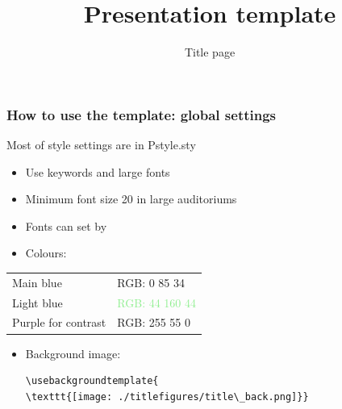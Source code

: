 \documentclass[aspectratio=169, 18pt]{beamer}
\title{Presentation template}
\subtitle{Title page}
\begin{document}
	
	
	\FirstFrame	
	\begin{frame}
	\titlepage
	\end{frame}
	
	\FrameStyleOne
	\begin{frame}[fragile]
		\frametitle{How to use the template: global settings}
		
		Most of style settings are in Pstyle.sty
		\begin{itemize}
			\item Use keywords and large fonts
			\item Minimum font size 20 in large auditoriums
			\item Fonts can set by \texttt{\setmainfont{fontname}}
			\item Colours:
		\end{itemize}
			\centering
			\begin{tabular}{ll}
				Main blue & \textcolor{maingreen}{RGB: 0 85 34} \\
				Light blue & \textcolor{lightgreen}{RGB: 44 160 44} \\
				Purple for contrast & \textcolor{orangec}{RGB: 255 55 0} \\
			\end{tabular}
			
		\begin{itemize}
			\item Background image: 
			\begin{verbatim}
\usebackgroundtemplate{
\texttt{[image: ./titlefigures/title\_back.png]}}
			\end{verbatim}
		\end{itemize}
	\end{frame}
	
\end{document}
